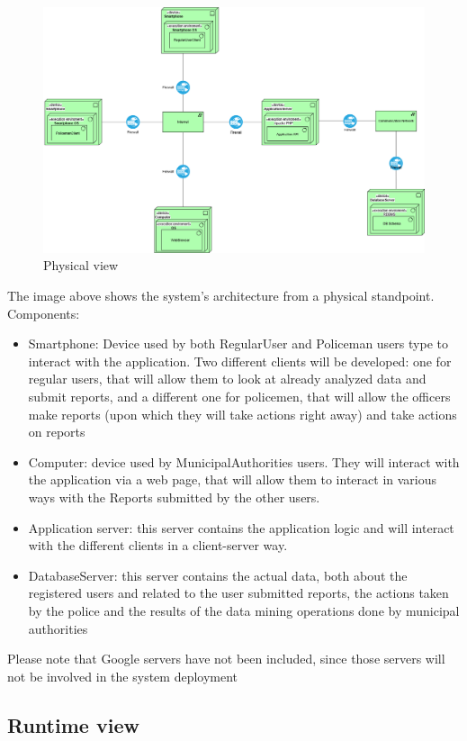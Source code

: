 \begin{figure}[h!]
	\centering
	\includegraphics[width=\textwidth]{Images/physical_view}
	\caption{Physical view}
\end{figure}

The image above shows the system's architecture from a physical standpoint.
Components:
\begin{itemize}
\item Smartphone: Device used by both RegularUser and Policeman users type to interact with the application. Two different clients will be developed: one for regular users, that will allow them to look at already analyzed data and submit reports, and a different one for policemen, that will allow the officers make reports (upon which they will take actions right away) and take actions on reports
\item Computer: device used by MunicipalAuthorities users. They will interact with the application via a web page, that will allow them to interact in various ways with the Reports submitted by the other users.
\item Application server: this server contains the application logic and will interact with the different clients in a client-server way.
\item DatabaseServer: this server contains the actual data, both about the registered users and related to the user submitted reports, the actions taken by the police and the results of the data mining operations done by municipal authorities
\end{itemize}
Please note that Google servers have not been included, since those servers will not be involved in the system deployment
\newpage
\subsection{Runtime view}
\newpage
